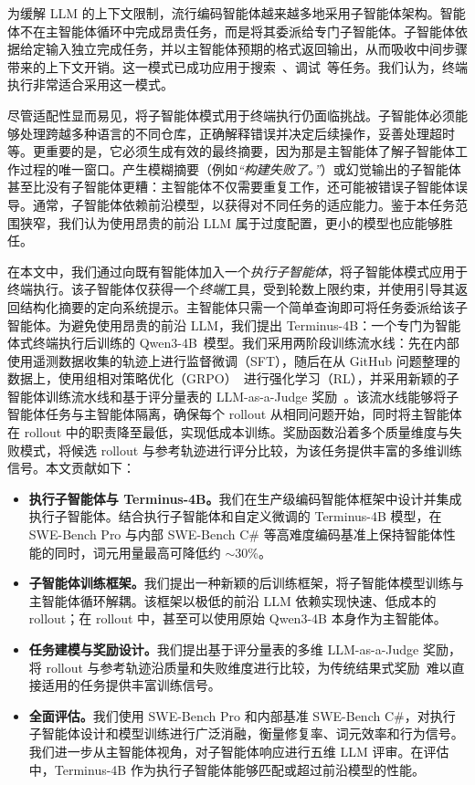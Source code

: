 \documentclass[sigconf,review]{acmart}
\begin{document}
为缓解 LLM 的上下文限制，流行编码智能体越来越多地采用子智能体架构。智能体不在主智能体循环中完成昂贵任务，而是将其委派给专门子智能体。子智能体依据给定输入独立完成任务，并以主智能体预期的格式返回输出，从而吸收中间步骤带来的上下文开销。这一模式已成功应用于搜索~\cite{claude_code_2024}、调试~\cite{debug2fix}等任务。我们认为，终端执行非常适合采用这一模式。

尽管适配性显而易见，将子智能体模式用于终端执行仍面临挑战。子智能体必须能够处理跨越多种语言的不同仓库，正确解释错误并决定后续操作，妥善处理超时等。更重要的是，它必须生成有效的最终摘要，因为那是主智能体了解子智能体工作过程的唯一窗口。产生模糊摘要（例如\textit{“构建失败了。”}）或幻觉输出的子智能体甚至比没有子智能体更糟：主智能体不仅需要重复工作，还可能被错误子智能体误导。通常，子智能体依赖前沿模型，以获得对不同任务的适应能力。鉴于本任务范围狭窄，我们认为使用昂贵的前沿 LLM 属于过度配置，更小的模型也应能够胜任。

在本文中，我们通过向既有智能体加入一个\textit{执行子智能体}，将子智能体模式应用于终端执行。该子智能体仅获得一个\textit{终端}工具，受到轮数上限约束，并使用引导其返回结构化摘要的定向系统提示。主智能体只需一个简单查询即可将任务委派给该子智能体。为避免使用昂贵的前沿 LLM，我们提出 Terminus-4B：一个专门为智能体式终端执行后训练的 Qwen3-4B~\cite{qwen}模型。我们采用两阶段训练流水线：先在内部使用遥测数据收集的轨迹上进行监督微调（SFT），随后在从 GitHub 问题整理的数据上，使用组相对策略优化（GRPO）~\cite{grpo}进行强化学习（RL），并采用新颖的子智能体训练流水线和基于评分量表的 LLM-as-a-Judge 奖励~\cite{llmjudge, rubric}。该流水线能够将子智能体任务与主智能体隔离，确保每个 rollout 从相同问题开始，同时将主智能体在 rollout 中的职责降至最低，实现低成本训练。奖励函数沿着多个质量维度与失败模式，将候选 rollout 与参考轨迹进行评分比较，为该任务提供丰富的多维训练信号。本文贡献如下：

\begin{itemize}
    \item \textbf{执行子智能体与 Terminus-4B。}我们在生产级编码智能体框架中设计并集成执行子智能体。结合执行子智能体和自定义微调的 Terminus-4B 模型，在 SWE-Bench Pro 与内部 SWE-Bench C\# 等高难度编码基准上保持智能体性能的同时，词元用量最高可降低约 $\sim$30\%。
    \item \textbf{子智能体训练框架。}我们提出一种新颖的后训练框架，将子智能体模型训练与主智能体循环解耦。该框架以极低的前沿 LLM 依赖实现快速、低成本的 rollout；在 rollout 中，甚至可以使用原始 Qwen3-4B 本身作为主智能体。
    \item \textbf{任务建模与奖励设计。}我们提出基于评分量表的多维 LLM-as-a-Judge 奖励，将 rollout 与参考轨迹沿质量和失败维度进行比较，为传统结果式奖励~\cite{instructgpt}难以直接适用的任务提供丰富训练信号。
    \item \textbf{全面评估。}我们使用 SWE-Bench Pro 和内部基准 SWE-Bench C\#，对执行子智能体设计和模型训练进行广泛消融，衡量修复率、词元效率和行为信号。我们进一步从主智能体视角，对子智能体响应进行五维 LLM 评审。在评估中，Terminus-4B 作为执行子智能体能够匹配或超过前沿模型的性能。
\end{itemize}
\end{document}
